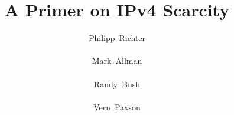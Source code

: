 \documentclass[letter]{sigcomm-alternate}
\begin{document}
\title{A Primer on IPv4 Scarcity}

\author{
\alignauthor\mbox{Philipp Richter}\\
    \\
\alignauthor \hspace{-0.7in}\mbox{Mark Allman}\\
    \affaddr \hspace{-0.7in}{ICSI}\\
   \affaddr {}
\alignauthor \hspace{-1.4in}\mbox{Randy Bush}\\
    \affaddr \hspace{-1.4in}{Internet Initiative Japan}\\
    \affaddr {}
\alignauthor \hspace{-2in}\mbox{Vern Paxson}\\
    \affaddr \hspace{-2in}{UC Berkeley / ICSI }\\
    \affaddr {}
\vspace{1em}
\begin{tabular}{c}
\end{tabular}\\
\begin{tabular}{c}
\hspace{-7in}{\normalsize This article is an editorial note submitted to CCR. It has NOT been peer reviewed.}\\
\hspace{-7in}{\normalsize The authors take full responsibility for this article's
technical content. Comments can be posted through CCR Online.}
\end{tabular}
}
    


\maketitle
\end{document}
